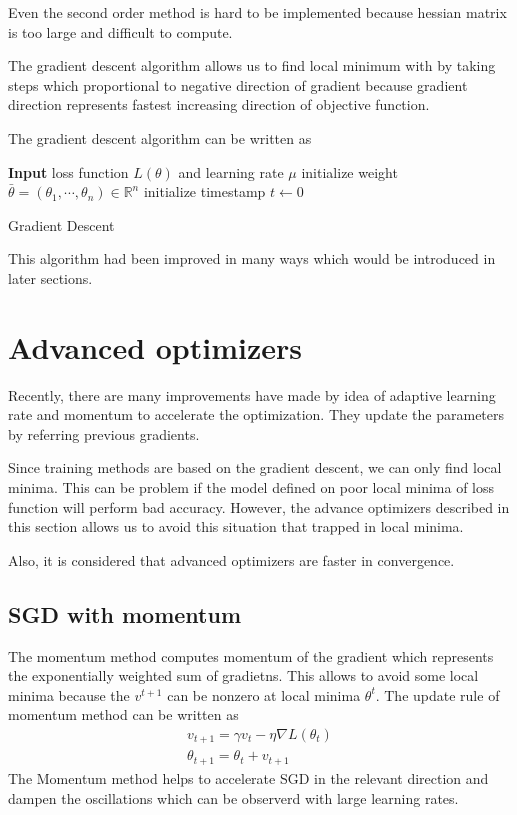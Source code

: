 \documentclass[11pt]{article}
\begin{document}
	Even the second order method is hard to be implemented because hessian matrix is too large and difficult to compute.

	The gradient descent algorithm allows us to find local minimum with by taking steps which proportional to negative direction of gradient because gradient direction represents fastest increasing direction of objective function.


	The gradient descent algorithm can be written as

	\begin{algorithm}[H]
		\SetAlgoLined
		\textbf{Input} loss function $L(\theta)$ and learning rate $\mu$\;
		 initialize weight $\bar{\theta}=(\theta_1,\cdots,\theta_n)\in\mathbb{R}^n$\;
		 initialize timestamp $t\longleftarrow 0$\;
		 
		 \caption{Gradient Descent}
	\end{algorithm}
	
	This algorithm had been improved in many ways which would be introduced in later sections.

	\section{Advanced optimizers}
	Recently, there are many improvements have made by idea of adaptive learning rate and momentum to accelerate the optimization. They update the parameters by referring previous gradients.

	Since training methods are based on the gradient descent, we can only find local minima. This can be problem if the model defined on poor local minima of loss function will perform bad accuracy. However, the advance optimizers described in this section allows us to avoid this situation that trapped in local minima.

	Also, it is considered that advanced optimizers are faster in convergence.
	\subsection{SGD with momentum}
	The momentum method computes momentum of the gradient which represents the exponentially weighted sum of gradietns. This allows to avoid some local minima because the $v^{t+1}$ can be nonzero at local minima $\theta^t$. The update rule of momentum method can be written as
	\begin{equation*}
		\begin{aligned}
			v_{t+1}=\gamma v_t-\eta \nabla L(\theta_t)\\
			\theta_{t+1}=\theta_t+v_{t+1}
		\end{aligned}
	\end{equation*}
	The Momentum method helps to accelerate SGD in the relevant direction and dampen the oscillations which can be observerd with large learning rates.
\end{document}
